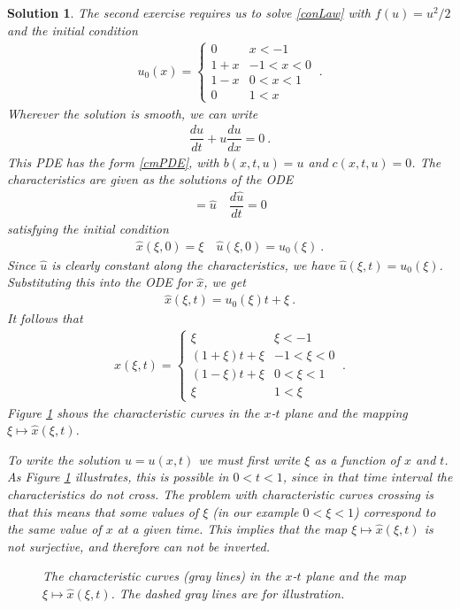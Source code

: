 \documentclass[10pt,letterpaper]{article}
\newcommand{\rb}[1]{ \left(  {#1} \right) }
\newcommand{\frb}[1]{ \left(  {#1} \right) }
\theoremstyle{break}
\newtheorem{mysolution}{Solution}
\newenvironment{solution}{\begin{mysolution}}{\end{mysolution}}
\begin{document}
\begin{solution}
	The second exercise requires us to solve \eqref{conLaw} with $f(u)=u^2/2$ and the initial condition
	\begin{gather}
		u_0(x)=\begin{cases}
				0 	& 	  x<-1\\
				1+x  	& -1 < x<0\\
				1-x 	&  0 < x<1\\
				0 	&  1 < x
			\end{cases}\ .
	\end{gather}
	Wherever the solution is smooth, we can write
	\begin{gather}
		\dfrac{du}{dt}+u\dfrac{du}{dx}=0\ .
	\end{gather}
	This PDE has the form \eqref{cmPDE}, with $b(x,t,u) = u$ and $c(x,t,u) = 0$.
	The characteristics are given as the solutions of the ODE
	\begin{gather}
		=\hat u
		\quad
		\dfrac{d\hat u}{dt} =0
	\end{gather}
	satisfying the initial condition
	\begin{gather}
		\hat x\frb{\xi,0} =\xi
		\quad
		\hat u\frb{\xi,0} =u_0\frb{\xi}\ .
	\end{gather}
	Since $\hat u$ is clearly constant along the characteristics, we have $\hat u\frb{\xi,t}=u_0\frb{\xi}$.
	Substituting this into the ODE for $\hat x$, we get
	\begin{gather}
		\hat x\frb{\xi,t}=u_0\frb{\xi}t+\xi \ .
	\end{gather}
	It follows that
	\begin{gather}
		\hat x\frb{\xi,t}=\begin{cases}
				\xi 	& 	  \xi<-1\\
				\rb{1+\xi}t+\xi  	& -1 < \xi<0\\
				\rb{1-\xi}t+\xi 	&  0 < \xi<1\\
				\xi 	&  1 < \xi
			\end{cases}\ .
	\end{gather}
	Figure \ref{carXTplane} shows the characteristic curves in the $x$-$t$ plane and the mapping $\xi\mapsto \hat x\frb{\xi,t}$.
	
	To write the solution $u=u(x,t)$ we must first write $\xi$ as a function of $x$ and $t$.
	As Figure \ref{carXTplane} illustrates, this is possible in $0<t<1$, since in that time interval the characteristics do not cross.
	The problem with characteristic curves crossing is that this means that some values of $\xi$ (in our example $0<\xi<1$) correspond to the same value of $x$ at a given time.
	This implies that the map $\xi\mapsto \hat x\frb{\xi,t}$ is not surjective, and therefore can not be inverted.
	\begin{figure}
	\centering
	\caption{The characteristic curves (gray lines) in the $x$-$t$ plane and the map $\xi\mapsto \hat x\frb{\xi,t}$.
			The dashed gray lines are for illustration.}
	\label{carXTplane}
	\end{figure}
	

\end{solution}
\end{document}
